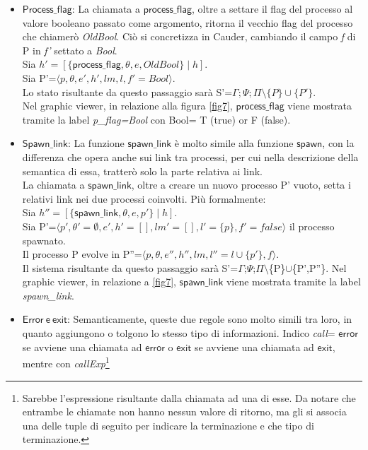 \documentclass[Contributo.tex]{subfiles}
\begin{document}
	\begin{itemize}
		\item $\mathsf{Process\_flag}$: 
		La chiamata a $\mathsf{process\_flag}$, oltre a settare il flag del processo al valore booleano passato come argomento, ritorna il vecchio flag del processo che chiamerò \textit{OldBool}.
		Ciò si concretizza in Cauder, cambiando il campo \textit{f} di P in \textit{f'} settato a \textit{Bool}.\\
		Sia $\displaystyle h'=[\{\mathsf{process\_flag},\theta,e,OldBool\} \mid h ]$.\\
		Sia P'=$\displaystyle \langle p,\theta,e',h',lm,l,f'=Bool \rangle$.\\
		Lo stato risultante da questo passaggio sarà S'=$\displaystyle \Gamma;\Psi;\Pi\setminus\{P\}\cup\{P'\}$.\\
		Nel graphic viewer, in relazione alla figura \ref{fig7}, $\mathsf{process\_flag}$ viene mostrata tramite la label \textit{p\_flag=Bool} con Bool= T (true) or F (false).
		\item $\mathsf{Spawn\_link}$: 
		La funzione $\mathsf{spawn\_link}$ è molto simile alla funzione $\mathsf{spawn}$, con la differenza che opera anche sui link tra processi, per cui nella descrizione della semantica di essa, tratterò solo la parte relativa ai link.\\
		La chiamata a $\mathsf{spawn\_link}$, oltre a creare un nuovo processo P' vuoto, setta i relativi link nei due processi coinvolti. Più formalmente:\\
		Sia $\displaystyle h''=[\{\mathsf{spawn\_link},\theta,e,p'\} \mid h]$.\\
		Sia P'=$\displaystyle \langle p',\theta'= \emptyset,e',h'=[],lm'=[],l'=\{p\},f'=false \rangle$ il processo spawnato.\\
		Il processo P evolve in P''=$\displaystyle \langle p,\theta,e'',h'',lm,l''=l \cup\{p'\},f \rangle$.\\
		Il sistema risultante da questo passaggio sarà S'=$\Gamma$;$\Psi$;$\Pi$$\setminus$\{P\}$\cup$\{P',P''\}.
		Nel graphic viewer, in relazione a \ref{fig7}, $\mathsf{spawn\_link}$ viene mostrata tramite la label \textit{spawn\_link}.
		\item $\mathsf{Error~e~exit}$: 
		Semanticamente, queste due regole sono molto simili tra loro, in quanto aggiungono o tolgono lo stesso tipo di informazioni. Indico \textit{call}= $\mathsf{error}$ se avviene una chiamata ad $\mathsf{error}$ o $\mathsf{exit}$ se avviene una chiamata ad $\mathsf{exit}$, mentre con \textit{callExp}\footnote{Sarebbe l'espressione risultante dalla chiamata ad una di esse. Da notare che entrambe le chiamate non hanno nessun valore di ritorno, ma gli si associa una delle tuple di seguito per indicare la terminazione e che tipo di terminazione.}
$$
\end{itemize}
\end{document}
